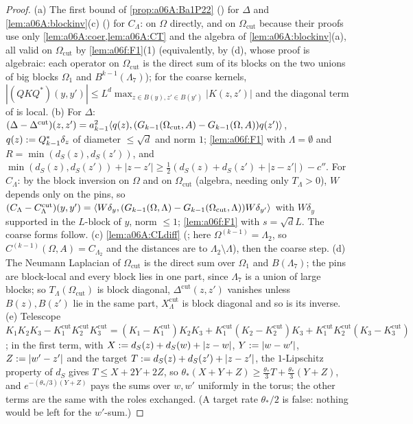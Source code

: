 \begin{proof}
(a) The first bound of \cref{prop:a06A:Ba1P22} (\cite[(2.27)]{Ba1}) for $\Delta$ and \cref{lem:a06A:blockinv}(c) (\cite[(1.16)]{Ba4}) for $C_\Lambda$: on $\Omega$ directly, and on $\Omega_{\mathrm{cut}}$ because their proofs use only \cref{lem:a06A:coer,lem:a06A:CT} and the algebra of \cref{lem:a06A:blockinv}(a), all valid on $\Omega_{\mathrm{cut}}$ by \cref{lem:a06f:F1}(1) (equivalently, by (d), whose proof is algebraic: each operator on $\Omega_{\mathrm{cut}}$ is the direct sum of its blocks on the two unions of big blocks $\Omega_1$ and $B^{k-1}(\Lambda_7)$); for the coarse kernels, $|(QKQ^*)(y,y')|\le L^d\max_{z\in B(y),z'\in B(y')}|K(z,z')|$ and the diagonal term of \cite[(2.27)]{Ba2} is local. (b) For $\Delta$: $(\Delta-\Delta^{\mathrm{cut}})(z,z')=a_{k-1}^2\langle q(z),(G_{k-1}(\Omega_{\mathrm{cut}},A)-G_{k-1}(\Omega,A))q(z')\rangle$, $q(z):= Q_{k-1}^*\delta_z$ of diameter $\le\sqrt d$ and norm $1$; \cref{lem:a06f:F1} with $\Lambda=\emptyset$ and $R=\min(d_S(z),d_S(z'))$, and $\min(d_S(z),d_S(z'))+|z-z'|\ge\frac12(d_S(z)+d_S(z')+|z-z'|)-c''$. For $C_\Lambda$: by the block inversion on $\Omega$ and on $\Omega_{\mathrm{cut}}$ (algebra, needing only $T_\Lambda>0$), $W$ depends only on the pins, so $(C_\Lambda-C^{\mathrm{cut}}_\Lambda)(y,y')=\langle W\delta_y,(G_{k-1}(\Omega,\Lambda)-G_{k-1}(\Omega_{\mathrm{cut}},\Lambda))W\delta_{y'}\rangle$ with $W\delta_y$ supported in the $L$-block of $y$, norm $\le1$; \cref{lem:a06f:F1} with $s=\sqrt dL$. The coarse forms follow. (c) \cref{lem:a06A:CLdiff} (\cite[(1.18)]{Ba4}; here $\Omega^{(k-1)}=\Lambda_2$, so $C^{(k-1)}(\Omega,A)=C_{\Lambda_2}$ and the distances are to $\Lambda_2\setminus\Lambda$), then the coarse step. (d) The Neumann Laplacian of $\Omega_{\mathrm{cut}}$ is the direct sum over $\Omega_1$ and $B(\Lambda_7)$; the pins are block-local and every block lies in one part, since $\Lambda_7$ is a union of large blocks; so $T_\Lambda(\Omega_{\mathrm{cut}})$ is block diagonal, $\Delta^{\mathrm{cut}}(z,z')$ vanishes unless $B(z),B(z')$ lie in the same part, $X^{\mathrm{cut}}_\Lambda$ is block diagonal and so is its inverse. (e) Telescope $K_1K_2K_3-K^{\mathrm{cut}}_1K^{\mathrm{cut}}_2K^{\mathrm{cut}}_3=(K_1-K^{\mathrm{cut}}_1)K_2K_3+K^{\mathrm{cut}}_1(K_2-K^{\mathrm{cut}}_2)K_3+K^{\mathrm{cut}}_1K^{\mathrm{cut}}_2(K_3-K^{\mathrm{cut}}_3)$; in the first term, with $X:= d_S(z)+d_S(w)+|z-w|$, $Y:=|w-w'|$, $Z:=|w'-z'|$ and the target $T:= d_S(z)+d_S(z')+|z-z'|$, the $1$-Lipschitz property of $d_S$ gives $T\le X+2Y+2Z$, so $\theta_*(X+Y+Z)\ge\frac{\theta_*}3T+\frac{\theta_*}3(Y+Z)$, and $e^{-(\theta_*/3)(Y+Z)}$ pays the sums over $w,w'$ uniformly in the torus; the other terms are the same with the roles exchanged. (A target rate $\theta_*/2$ is false: nothing would be left for the $w'$-sum.)
\end{proof}

